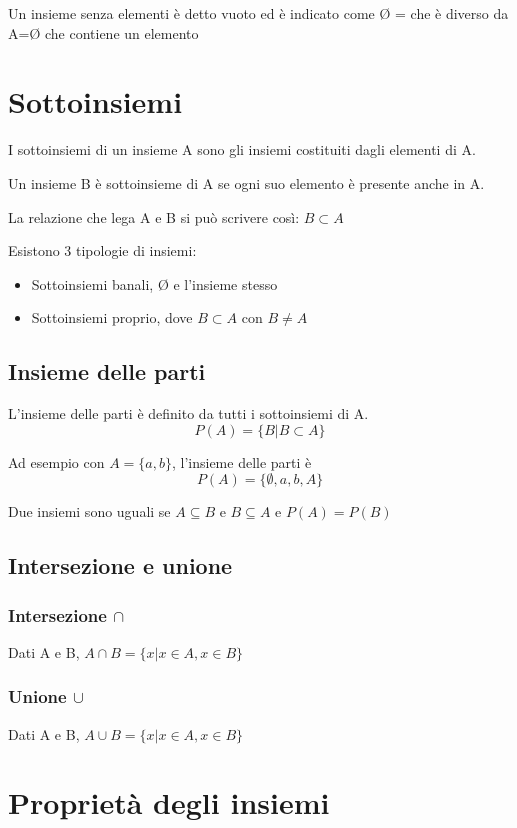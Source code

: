 \documentclass[a4paper, 10pt]{article}
\begin{document}
Un insieme senza elementi è detto vuoto ed è indicato come Ø = {} che è diverso da A={Ø} che contiene un elemento

\section{Sottoinsiemi}
I sottoinsiemi di un insieme A sono gli insiemi costituiti dagli elementi di A.

Un insieme B è sottoinsieme di A se ogni suo elemento è presente anche in A.

La relazione che lega A e B si può scrivere così: $ B \subset A $

Esistono 3 tipologie di insiemi:

\begin{itemize}
	\item Sottoinsiemi banali, Ø e l'insieme stesso
	\item Sottoinsiemi proprio, dove $ B \subset A $ con $ B \neq A $
\end{itemize}

\subsection{Insieme delle parti}
L'insieme delle parti è definito da tutti i sottoinsiemi di A.
$$ P(A) = \{ B | B \subset A \} $$

Ad esempio con $ A = \{ a, b\} $, l'insieme delle parti è
$$ P(A) = \{ \emptyset, {a}, {b}, A\} $$

Due insiemi sono uguali se $ A \subseteq B $  e $ B \subseteq A $ e $ P(A) = P(B) $

\subsection{Intersezione e unione}

\subsubsection{Intersezione $ \cap $}
Dati A e B, $ A \cap B = \{ x | x \in A, x \in B \} $

\subsubsection{Unione $ \cup $}
Dati A e B, $ A \cup B = \{ x | x \in A, x \in B \} $

\section{Proprietà degli insiemi}
\end{document}
